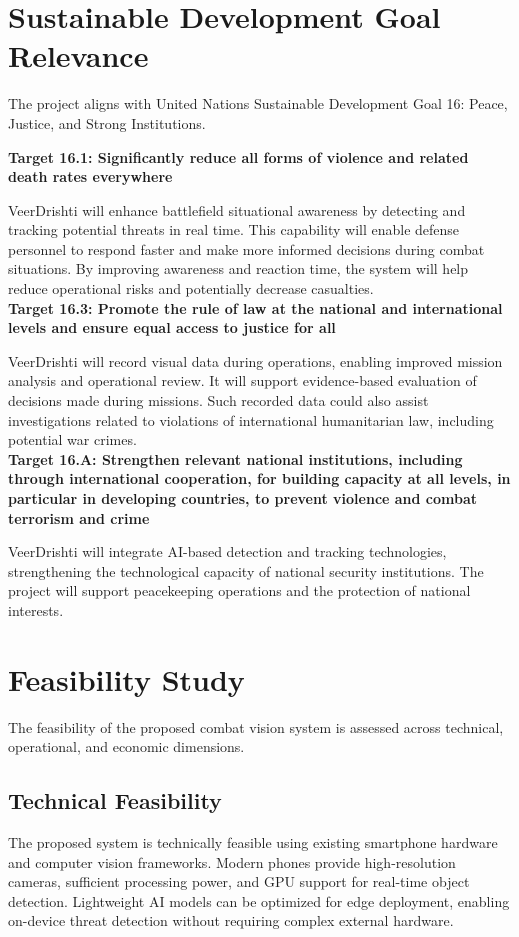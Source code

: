 \label{end:methodology}
\section{Sustainable Development Goal Relevance}\label{sec:sdg}
The project aligns with United Nations Sustainable Development Goal 16: Peace, Justice, and Strong
Institutions.

\textbf{Target 16.1: Significantly reduce all forms of violence and related death rates everywhere}

VeerDrishti will enhance battlefield situational awareness by detecting and tracking potential
threats in real time. This capability will enable defense personnel to respond faster and make more
informed decisions during combat situations. By improving awareness and reaction time, the system
will help reduce operational risks and potentially decrease casualties. \\

\textbf{Target 16.3: Promote the rule of law at the national and international levels and ensure
  equal access to justice for all}

VeerDrishti will record visual data during operations, enabling improved mission analysis and
operational review. It will support evidence-based evaluation of decisions made during missions.
Such recorded data could also assist investigations related to violations of international
humanitarian law, including potential war crimes. \\

\textbf{Target 16.A: Strengthen relevant national institutions, including through international
  cooperation, for building capacity at all levels, in particular in developing countries, to
  prevent violence and combat terrorism and crime}

VeerDrishti will integrate AI-based detection and tracking technologies, strengthening the
technological capacity of national security institutions. The project will support peacekeeping
operations and the protection of national interests.

\label{end:sdg}
\section{Feasibility Study}\label{sec:feasibility}
The feasibility of the proposed combat vision system is assessed across technical, operational, and
economic dimensions.

\subsection{Technical Feasibility}
The proposed system is technically feasible using existing smartphone hardware and computer vision
frameworks. Modern phones provide high-resolution cameras, sufficient processing power, and GPU
support for real-time object detection. Lightweight AI models can be optimized for edge deployment,
enabling on-device threat detection without requiring complex external hardware.

